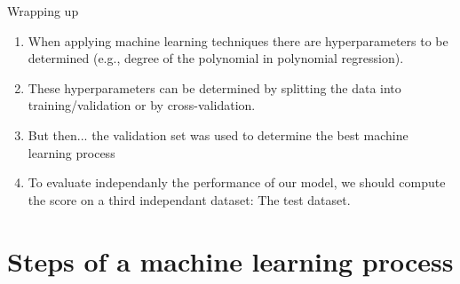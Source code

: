 \documentclass[handout, 10pt]{beamer}
\begin{document}
\begin{frame}{Wrapping up}
\begin{enumerate}[<+->]
    \item When applying machine learning techniques there are \alert{hyperparameters} to be determined (e.g., degree of the polynomial in polynomial regression).
    \item These \alert{hyperparameters}  can be determined by splitting the data into training/validation or by cross-validation.
    \item But then... the validation set was used to determine the best machine learning process
    \item To evaluate independanly the performance of our model, we should compute the score on a \alert{third independant dataset: The test dataset}.
    
\end{enumerate}
\end{frame}




\section{Steps of a machine learning process}
\end{document}

